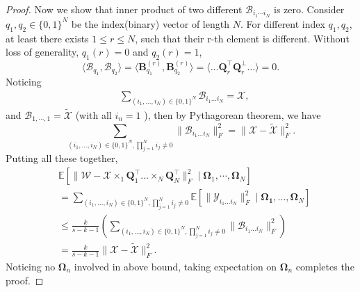 \begin{proof}
Now we show that inner product of two different $\mathscr{B}_{i_1\cdots i_N}$ is zero. Consider $q_1, q_2 \in \{0,1\}^N$ be the index(binary) vector of length $N$. For different index $q_1, q_2$, at least there exists $1\le r\le N$, such that their r-th element is different. Without loss of generality, $q_1(r) = 0$ and  $q_2(r)=1$, \begin{equation}\label{eq:inner_prod2}
\langle \mathscr{B}_{q_1}, \mathscr{B}_{q_2}\rangle = \langle  \mathbf{B}^{(r)}_{q_1}, \mathbf{B}^{(r)}_{q_2} \rangle = \langle \dots \mathbf{Q}_r^\top \mathbf{Q}_r^\bot \dots\rangle  = 0. 
\end{equation}
Noticing 
\begin{equation}
\begin{aligned}
&\sum_{(i_1,\dots, i_N) \in \{0,1\}^N} \mathscr{B}_{i_1\dots i_N} = \mathscr{X},  
\end{aligned}
\end{equation}
and $\mathscr{B}_{1,\cdots, 1} = \tilde{\mathscr{X}}$ (with all $i_n=1$ ), then by Pythagorean theorem, we have
\begin{equation}
\sum_{(i_1,\dots, i_N) \in \{0,1\}^N, \prod_{j=1}^N i_j \neq 0} \|\mathscr{B}_{i_1\dots i_N}\|_F^2 = \|\mathscr{X} - \tilde{\mathscr{X}}\|_F^2. 
\end{equation}
Putting all these together, 
\begin{equation}
\begin{aligned}
&\mathbb{E}\left[ \|\mathscr{W} - \mathscr{X}\times_1 \mathbf{Q}_1^\top \dots \times_N \mathbf{Q}_N^\top\|_F^2 \mid \mathbf{\Omega}_1, \cdots, \mathbf{\Omega}_N \right] \\
& = \sum_{(i_1,\dots, i_N) \in \{0,1\}^N, \prod_{j=1}^N i_j \neq 0} \mathbb{E} \left[\|\mathscr{Y}_{i_1\dots i_N}\|_F^2 \mid \mathbf{\Omega_1}, \dots, \mathbf{\Omega}_N\right]\\
&\le \frac{k}{s-k-1} \left(\sum_{(i_1,\dots, i_N) \in \{0,1\}^N, \prod_{j=1}^N i_j \neq 0} \|\mathscr{B}_{i_1\dots i_N}\|_F^2 \right)\\
&= \frac{k}{s-k-1} \|\mathscr{X} - \tilde{\mathscr{X}}\|_F^2. 
\end{aligned}
\end{equation}
Noticing no $\mathbf{\Omega}_n$ involved in above bound, taking expectation on $\mathbf{\Omega}_n$ completes the proof. 
\end{proof}



